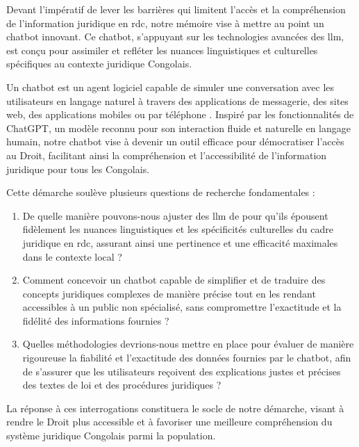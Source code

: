 Devant l'impératif de lever les barrières qui limitent l'accès et la compréhension de l'information juridique en \ac{rdc}, notre mémoire vise à mettre au point un chatbot innovant. Ce chatbot, s'appuyant sur les technologies avancées des \ac{llm}, est conçu pour assimiler et refléter les nuances linguistiques et culturelles spécifiques au contexte juridique Congolais. 

Un chatbot est un agent logiciel capable de simuler une conversation avec les utilisateurs en langage naturel à travers des applications de messagerie, des sites web, des applications mobiles ou par téléphone \cite{Pritchett_2019}. Inspiré par les fonctionnalités de ChatGPT, un modèle reconnu pour son interaction fluide et naturelle en langage humain, notre chatbot vise à devenir un outil efficace pour démocratiser l'accès au Droit, facilitant ainsi la compréhension et l'accessibilité de l'information juridique pour tous les Congolais.

Cette démarche soulève plusieurs questions de recherche fondamentales :

\begin{enumerate}
    \item De quelle manière pouvons-nous ajuster des \ac{llm} de  pour qu'ils épousent fidèlement les nuances linguistiques et les spécificités culturelles du cadre juridique en \ac{rdc}, assurant ainsi une pertinence et une efficacité maximales dans le contexte local ?
    
    \item Comment concevoir un chatbot capable de simplifier et de traduire des concepts juridiques complexes de manière précise tout en les rendant accessibles à un public non spécialisé, sans compromettre l'exactitude et la fidélité des informations fournies ?

    \item Quelles méthodologies devrions-nous mettre en place pour évaluer de manière rigoureuse la fiabilité et l'exactitude des données fournies par le chatbot, afin de s'assurer que les utilisateurs reçoivent des explications justes et précises des textes de loi et des procédures juridiques ?
\end{enumerate}

La réponse à ces interrogations constituera le socle de notre démarche, visant à rendre le Droit plus accessible et à favoriser une meilleure compréhension du système juridique Congolais parmi la population.

